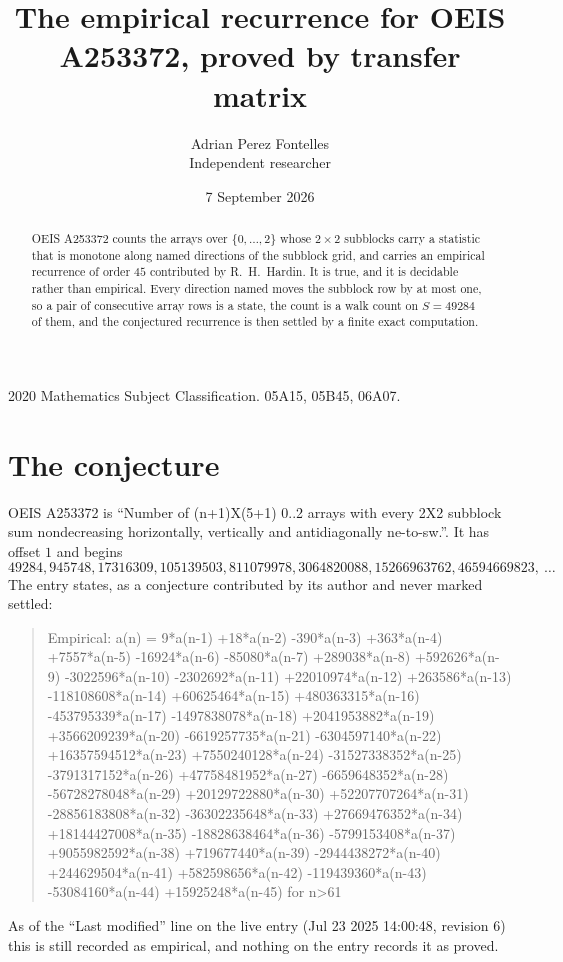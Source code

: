 \documentclass[11pt,a4paper]{article}
\title{The empirical recurrence for OEIS A253372, proved by transfer matrix}
\author{Adrian Perez Fontelles\\ \small Independent researcher}
\date{7 September 2026}
\theoremstyle{plain}
\theoremstyle{definition}
\begin{document}
\maketitle

\begin{abstract}
OEIS A253372 counts the arrays over $\{0,\dots,2\}$ whose $2\times2$ subblocks carry a
statistic that is monotone along named directions of the subblock grid, and carries an
empirical recurrence of order $45$ contributed by R.~H.~Hardin. It is true, and it is
decidable rather than empirical. Every direction named moves the subblock row by at most one,
so a pair of consecutive array rows is a state, the count is a walk count on $S=49284$ of them,
and the conjectured recurrence is then settled by a finite exact computation.
\end{abstract}

\noindent\small 2020 Mathematics Subject Classification. 05A15, 05B45, 06A07.\normalsize

\section{The conjecture}

OEIS A253372 is ``Number of (n+1)X(5+1) 0..2 arrays with every 2X2 subblock sum nondecreasing horizontally, vertically and antidiagonally ne-to-sw.''. It has offset $1$ and begins
\[
49284, 945748, 17316309, 105139503, 811079978, 3064820088, 15266963762, 46594669823,\ \dots
\]
The entry states, as a conjecture contributed by its author and never marked settled:
\begin{quote}
Empirical: a(n) = 9*a(n-1) +18*a(n-2) -390*a(n-3) +363*a(n-4) +7557*a(n-5) -16924*a(n-6) -85080*a(n-7) +289038*a(n-8) +592626*a(n-9) -3022596*a(n-10) -2302692*a(n-11) +22010974*a(n-12) +263586*a(n-13) -118108608*a(n-14) +60625464*a(n-15) +480363315*a(n-16) -453795339*a(n-17) -1497838078*a(n-18) +2041953882*a(n-19) +3566209239*a(n-20) -6619257735*a(n-21) -6304597140*a(n-22) +16357594512*a(n-23) +7550240128*a(n-24) -31527338352*a(n-25) -3791317152*a(n-26) +47758481952*a(n-27) -6659648352*a(n-28) -56728278048*a(n-29) +20129722880*a(n-30) +52207707264*a(n-31) -28856183808*a(n-32) -36302235648*a(n-33) +27669476352*a(n-34) +18144427008*a(n-35) -18828638464*a(n-36) -5799153408*a(n-37) +9055982592*a(n-38) +719677440*a(n-39) -2944438272*a(n-40) +244629504*a(n-41) +582598656*a(n-42) -119439360*a(n-43) -53084160*a(n-44) +15925248*a(n-45) for n>61
\end{quote}
As of the ``Last modified'' line on the live entry (Jul 23 2025 14:00:48, revision 6) this is still
recorded as empirical, and nothing on the entry records it as proved.
\end{document}
